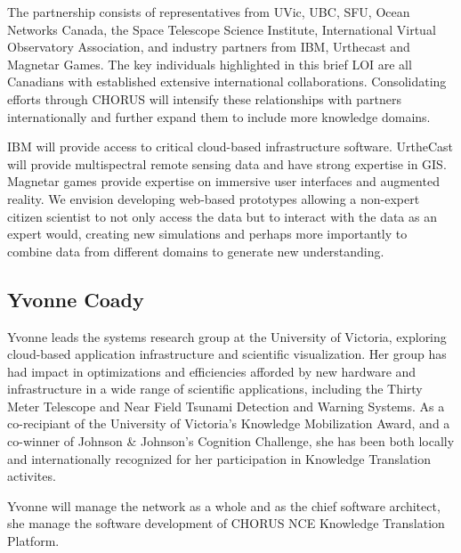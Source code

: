 

The partnership consists of representatives from UVic, UBC, SFU,
Ocean Networks Canada, the Space Telescope Science
Institute, International Virtual Observatory Association, and industry
partners from IBM, Urthecast and Magnetar Games.  The key individuals
highlighted in this brief LOI are all Canadians with established
extensive international collaborations.  Consolidating efforts through
CHORUS will intensify these relationships with partners
internationally and further expand them to include more knowledge
domains.


IBM will provide access to critical cloud-based infrastructure software.  UrtheCast will provide multispectral remote sensing data and have
strong expertise in GIS.  Magnetar games provide expertise on
immersive user interfaces and augmented reality.  We envision
developing web-based prototypes allowing a non-expert citizen
scientist to not only access the data but to interact with the data as
an expert would, creating new simulations and perhaps more importantly
to combine data from different domains to generate new understanding.

\subsection*{Yvonne Coady} 

Yvonne leads the systems research group at the University of Victoria,
exploring cloud-based application infrastructure and scientific
visualization.  Her group has had impact in optimizations and
efficiencies afforded by new hardware and infrastructure in a wide
range of scientific applications, including the Thirty Meter Telescope
and Near Field Tsunami Detection and Warning Systems.  As a
co-recipiant of the University of Victoria's Knowledge Mobilization
Award, and a co-winner of Johnson \& Johnson's Cognition Challenge, she
has been both locally and internationally recognized for her
participation in Knowledge Translation activites.

Yvonne will manage the network as a whole and as the chief software
architect, she manage the software development of CHORUS NCE Knowledge
Translation Platform.

